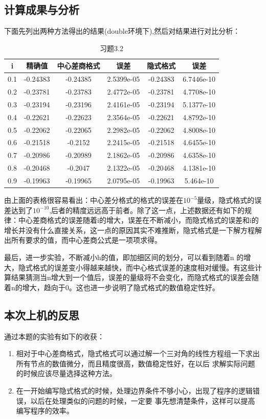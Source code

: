 \documentclass[10pt,a4paper]{ctexart}
\begin{document}
\subsection {计算成果与分析}
下面先列出两种方法得出的结果(double环境下),然后对结果进行对比分析：
\begin{center}
\begin{longtable}{|c|c|cc|cc|}
\caption{习题3.2}\\
\hline
i& 精确值& 中心差商格式 & 误差& 隐式格式 & 误差 \\
\hline
0.1& -0.24383& -0.24385& 2.5399e-05& -0.24383& 6.7446e-10  \\
\hline
0.2& -0.23781& -0.23783& 2.4772e-05& -0.23781& 4.7708e-10 \\
\hline
0.3& -0.23194& -0.23196& 2.4161e-05& -0.23194& 5.1377e-10 \\
\hline
0.4& -0.22621& -0.22623& 2.3564e-05& -0.22621& 4.8792e-10 \\
\hline
0.5& -0.22062& -0.22065& 2.2982e-05& -0.22062& 4.8008e-10 \\
\hline
0.6& -0.21518& -0.2152& 2.2415e-05& -0.21518& 4.6455e-10 \\
\hline
0.7& -0.20986& -0.20989& 2.1862e-05& -0.20986& 4.6358e-10 \\
\hline
0.8& -0.20468& -0.2047& 2.1322e-05& -0.20468& 4.1381e-10 \\
\hline
0.9& -0.19963& -0.19965& 2.0795e-05& -0.19963& 5.464e-10\\
\hline 
\end{longtable}
\end{center}
由上面的表格很容易看出：中心差分格式的格式的误差在$10^{-5}$量级，隐式格式的误差达到了$10^{-10}$,后者的精度远远高于前者。除了这一点，上述数据还有如下的规律：中心差商格式的误差随着i的增大，误差在不断减小，而隐式格式的误差和i的增长并没有什么直接关系，这一点的原因其实不难推断，隐式格式是一下解方程解出所有要求的值，而中心差商公式是一项项求得。

最后，进一步实验，不断减小h的值，即加细区间的划分，可以看到随着n
的增大，隐式格式的误差变小得越来越快，而中心格式误差的速度相对缓慢。有这些计算结果猜测当n增大到一个值后，误差的量级将不会变化，而隐式格式的误差会随着n的增大，趋向于0。这也进一步说明了隐式格式的数值稳定性好。
\subsection{本次上机的反思}
通过本题的实验有如下的收获：
\begin{enumerate}
\item 
相对于中心差商格式，隐式格式可以通过解一个三对角的线性方程组一下求出所有节点的数值微分，而且精度很高，数值稳定性好，在以后
求解实际问题的时候应该尽量选择这种方法。
\item 
在一开始编写隐式格式的时候，处理边界条件不够小心，出现了程序的逻辑错误，以后在处理类似的问题的时候，一定要
事先想清楚条件，这样可以提高编写程序的效率。
\end{enumerate}
\end{document}
